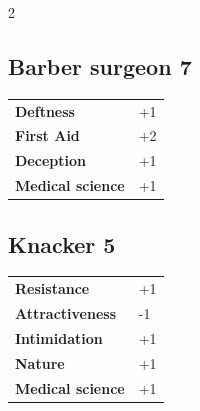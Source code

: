 \begin{multicols}{2}
\begin{tcolorbox}

\end{tcolorbox}

\begin{tcolorbox}
    \subsection*{Barber surgeon \hfill \small{7 }}
    \tcblower




\begin{tabular}{@{}ll@{}}
    \textbf{Deftness} & +1\\
    \textbf{First Aid} & +2\\
    \textbf{Deception} & +1\\
    \textbf{Medical science} & +1\\
\end{tabular}


\end{tcolorbox}

\begin{tcolorbox}
    \subsection*{Knacker \hfill \small{5 }}
    \tcblower




\begin{tabular}{@{}ll@{}}
    \textbf{Resistance} & +1\\
    \textbf{Attractiveness} & -1\\
    \textbf{Intimidation} & +1\\
    \textbf{Nature} & +1\\
    \textbf{Medical science} & +1\\
\end{tabular}



\end{tcolorbox}
\end{multicols}
